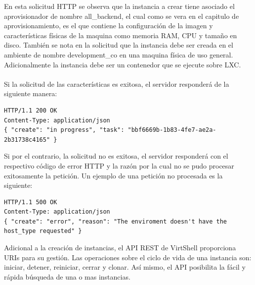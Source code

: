 \vspace{5mm}

En esta solicitud HTTP se observa que la instancia a crear tiene asociado el aprovisionador de nombre all\_backend, el cual como se vera en el capitulo de aprovisionamiento, es el que contiene la configuración de la imagen y características físicas de la maquina como memoria RAM, CPU y tamaño en disco. También se nota en la solicitud que la instancia debe ser creada en el ambiente de nombre development\_co en una maquina física de uso general. Adicionalmente la instancia debe ser un contenedor que se ejecute sobre LXC.\\
\\
Si la solicitud de las características es exitosa, el servidor responderá de la siguiente manera:

\vspace{2cm}

\begin{lstlisting}[style=json, caption=Ejemplo de respuesta HTTP a la solicitud de crear una instancia]
HTTP/1.1 200 OK
Content-Type: application/json
{ "create": "in progress", "task": "bbf6669b-1b83-4fe7-ae2a-2b31738c4165" }
\end{lstlisting}

\vspace{5mm}

Si por el contrario, la solicitud no es exitosa, el servidor responderá con el respectivo código de error HTTP y la razón por la cual no se pudo procesar exitosamente la petición. Un ejemplo de una petición no procesada es la siguiente: 

\vspace{5mm}

\begin{lstlisting}[style=json, caption=Ejemplo de respuesta HTTP con error a la solicitud de crear una instancia]
HTTP/1.1 500 OK
Content-Type: application/json
{ "create": "error", "reason": "The enviroment doesn't have the host_type requested" }
\end{lstlisting}

\vspace{5mm}

Adicional a la creación de instancias, el API REST de VirtShell proporciona URIs para su gestión. Las operaciones sobre el ciclo de vida de una instancia son: iniciar, detener, reiniciar, cerrar y clonar. Así mismo, el API posibilita la fácil y rápida búsqueda de una o mas instancias.  

